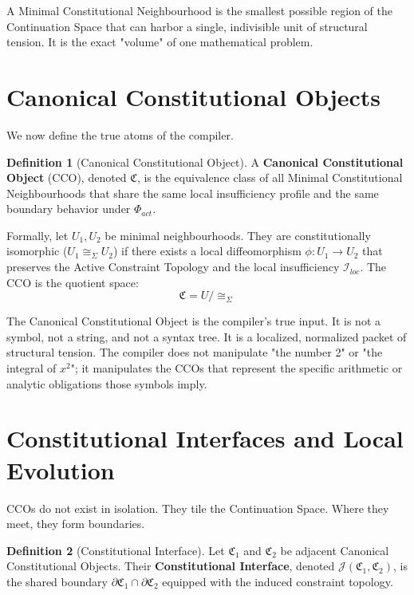 \documentclass[12pt,openany]{extbook}
\theoremstyle{plain}
\theoremstyle{definition}
\newtheorem{definition}{Definition}[chapter]
\begin{document}
A Minimal Constitutional Neighbourhood is the smallest possible region of the Continuation Space that can harbor a single, indivisible unit of structural tension. It is the exact "volume" of one mathematical problem.

\section{Canonical Constitutional Objects}

We now define the true atoms of the compiler. 

\begin{definition}[Canonical Constitutional Object]
A \textbf{Canonical Constitutional Object} (CCO), denoted $\mathfrak{C}$, is the equivalence class of all Minimal Constitutional Neighbourhoods that share the same local insufficiency profile and the same boundary behavior under $\Phi_{act}$. 

Formally, let $U_1, U_2$ be minimal neighbourhoods. They are constitutionally isomorphic ($U_1 \cong_{\Sigma} U_2$) if there exists a local diffeomorphism $\phi: U_1 \to U_2$ that preserves the Active Constraint Topology and the local insufficiency $\mathcal{I}_{loc}$. The CCO is the quotient space:
\[
\mathfrak{C} = U / \cong_{\Sigma}
\]
\end{definition}

The Canonical Constitutional Object is the compiler's true input. It is not a symbol, not a string, and not a syntax tree. It is a localized, normalized packet of structural tension. The compiler does not manipulate "the number 2" or "the integral of $x^2$"; it manipulates the CCOs that represent the specific arithmetic or analytic obligations those symbols imply.

\section{Constitutional Interfaces and Local Evolution}

CCOs do not exist in isolation. They tile the Continuation Space. Where they meet, they form boundaries.

\begin{definition}[Constitutional Interface]
Let $\mathfrak{C}_1$ and $\mathfrak{C}_2$ be adjacent Canonical Constitutional Objects. Their \textbf{Constitutional Interface}, denoted $\mathcal{J}(\mathfrak{C}_1, \mathfrak{C}_2)$, is the shared boundary $\partial \mathfrak{C}_1 \cap \partial \mathfrak{C}_2$ equipped with the induced constraint topology.
\end{definition}
\end{document}
